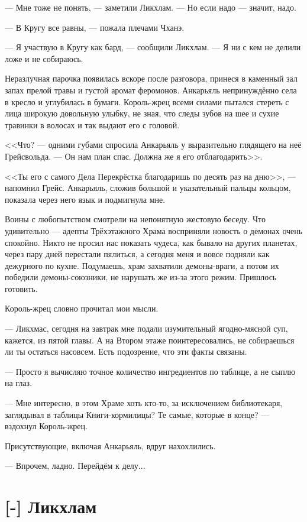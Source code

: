 --- Мне тоже не понять, --- заметили Ликхлам.
--- Но если надо --- значит, надо.

--- В Кругу все равны, --- пожала плечами Чханэ.

--- Я участвую в Кругу как бард, --- сообщили Ликхлам.
--- Я ни с кем не делили ложе и не собираюсь.

Неразлучная парочка появилась вскоре после разговора, принеся в каменный зал запах прелой травы и густой аромат феромонов.
Анкарьяль непринуждённо села в кресло и углубилась в бумаги.
Король-жрец всеми силами пытался стереть с лица широкую довольную улыбку, не зная, что следы зубов на шее и сухие травинки в волосах и так выдают его с головой.

<<Что? --- одними губами спросила Анкарьяль у выразительно глядящего на неё Грейсвольда.
--- Он нам план спас.
Должна же я его отблагодарить>>.

<<Ты его с самого Дела Перекрёстка благодаришь по десять раз на дню>>, --- напомнил Грейс.
Анкарьяль, сложив большой и указательный пальцы кольцом, показала через него язык и подмигнула мне.

Воины с любопытством смотрели на непонятную жестовую беседу.
Что удивительно --- адепты Трёхэтажного Храма восприняли новость о демонах очень спокойно.
Никто не просил нас показать чудеса, как бывало на других планетах, через пару дней перестали пялиться, а сегодня меня и вовсе подняли как дежурного по кухне.
Подумаешь, храм захватили демоны-враги, а потом их победили демоны-союзники, не нарушать же из-за этого режим.
Пришлось готовить.

Король-жрец словно прочитал мои мысли.

--- Ликхмас, сегодня на завтрак мне подали изумительный ягодно-мясной суп, кажется, из пятой главы\FM.
А на Втором этаже поинтересовались, не собираешься ли ты остаться насовсем.
Есть подозрение, что эти факты связаны.

--- Просто я вычисляю точное количество ингредиентов по таблице, а не сыплю на глаз.

--- Мне интересно, в этом Храме хоть кто-то, за исключением библиотекаря, заглядывал в таблицы Книги-кормилицы?
Те самые, которые в конце? --- вздохнул Король-жрец.

Присутствующие, включая Анкарьяль, вдруг нахохлились.

--- Впрочем, ладно.
Перейдём к делу...

\section{[-] Ликхлам}

